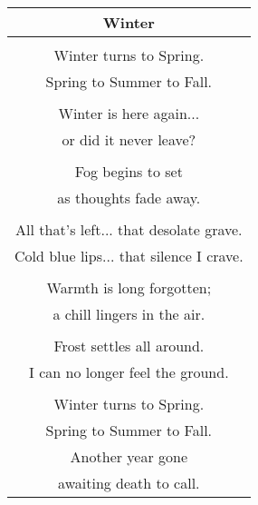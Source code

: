 \documentclass{article}
\begin{document}
\begin{center}
\begin{tabular}{c}
\textbf{Winter} \\ \hline
\\
Winter turns to Spring. \\
Spring to Summer to Fall. \\
\\
Winter is here again... \\
  or did it never leave? \\
\\
Fog begins to set \\
  as thoughts fade away. \\
\\
All that's left... that desolate grave. \\
Cold blue lips... that silence I crave. \\
\\
Warmth is long forgotten; \\
a chill lingers in the air. \\
\\
Frost settles all around. \\
I can no longer feel the ground. \\
\\
Winter turns to Spring. \\
Spring to Summer to Fall. \\
Another year gone \\
  awaiting death to call. \\
\end{tabular}
\end{center}
\end{document}
